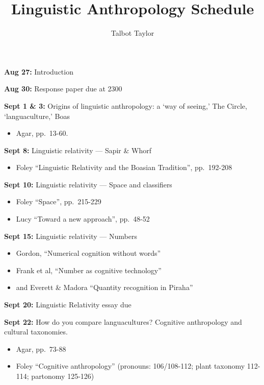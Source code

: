 \documentclass[12pt]{article}
\providecommand{\tightlist}{%
  \setlength{\itemsep}{0pt}\setlength{\parskip}{0pt}}
\begin{document}
\title{Linguistic Anthropology Schedule}
\author{Talbot Taylor}
\date{}
\maketitle

\textbf{Aug 27:} Introduction

\textbf{Aug 30:} Response paper due at 2300

\textbf{Sept 1 \& 3:} Origins of linguistic anthropology: a `way of
seeing,' The Circle, `languaculture,' Boas

\begin{itemize}
\tightlist
\item
  Agar, pp.~13-60.
\end{itemize}

\textbf{Sept 8:} Linguistic relativity --- Sapir \& Whorf

\begin{itemize}
\tightlist
\item
  Foley ``Linguistic Relativity and the Boasian Tradition'', pp.~192-208
\end{itemize}

\textbf{Sept 10:} Linguistic relativity --- Space and classifiers

\begin{itemize}
\tightlist
\item
  Foley ``Space'', pp.~215-229
\item
  Lucy ``Toward a new approach'', pp.~48-52
\end{itemize}

\textbf{Sept 15:} Linguistic relativity --- Numbers

\begin{itemize}
\tightlist
\item
  Gordon, ``Numerical cognition without words''
\item
  Frank et al, ``Number as cognitive technology''
\item
  and Everett \& Madora ``Quantity recognition in Piraha''
\end{itemize}

\textbf{Sept 20:} Linguistic Relativity essay due

\textbf{Sept 22:} How do you compare languacultures? Cognitive
anthropology and cultural taxonomies.

\begin{itemize}
\tightlist
\item
  Agar, pp.~73-88
\item
  Foley ``Cognitive anthropology'' (pronouns: 106/108-112; plant
  taxonomy 112-114; partonomy 125-126)
\end{itemize}
\end{document}

